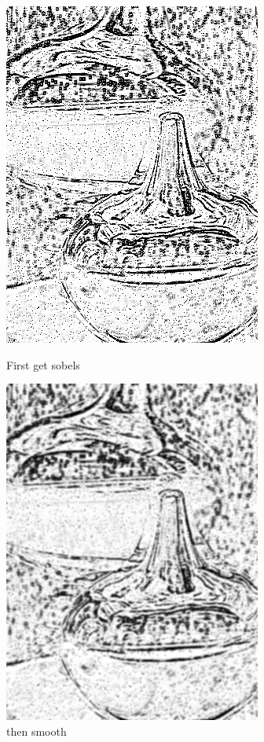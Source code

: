 \documentclass{article}
\begin{document}
\begin{figure}[h]
\begin{minipage}[b]{0.5\linewidth}
\centering
\includegraphics[scale=0.45]{firstsobel.PNG}
\caption{First get sobels}	
\end{minipage}
\begin{minipage}[b]{0.5\linewidth}
\centering
\includegraphics[scale=0.45]{thenblur.PNG}
\caption{then smooth}
\end{minipage}
\end{figure}
\end{document}

